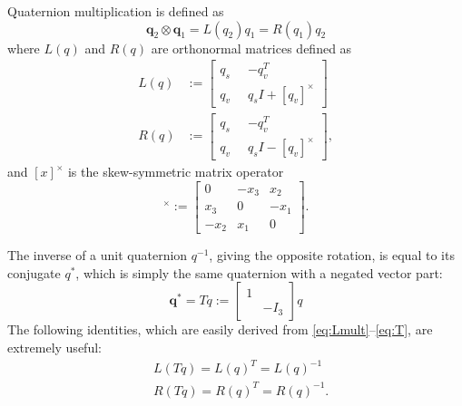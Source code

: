 \documentclass{svproc}
\newcommand{\skewmat}[1]{[#1]^\times}
\newcommand{\q}{\textbf{q}}
\begin{document}
        Quaternion multiplication is defined as
        \begin{equation} \label{eq:quat_mult}
            \q_2 \otimes \q_1 = L(q_2) q_1 = R(q_1) q_2
        \end{equation}
        where $L(q)$ and $R(q)$ are orthonormal matrices defined as
        \begin{align}
            L(q) &:= \begin{bmatrix} q_s \;\; & -q_v^T \\ q_v \;\; & q_s I + \skewmat{q_v} \end{bmatrix} 
            \label{eq:Lmult} \\
            R(q) &:=\begin{bmatrix} q_s \;\; & -q_v^T \\ q_v \;\; & q_s I - \skewmat{q_v} \end{bmatrix} \label{eq:Rmult},
        \end{align}
        and $\skewmat{x}$ is the skew-symmetric matrix operator
        \begin{equation}
            \skewmat{x} := \begin{bmatrix} 0 & -x_3 & x_2 \\ x_3 & 0 & -x_1\\ -x_2 & x_1 & 0 \end{bmatrix}.
        \end{equation}
        
        The inverse of a unit quaternion $q^{-1}$, giving the opposite rotation, is equal to its conjugate $q^*$, which is simply the same quaternion with a negated vector part:
        \begin{equation} \label{eq:T}
            \q^* = T q := \begin{bmatrix} 1 & \\ & -I_3 \end{bmatrix} q
        \end{equation}
        The following identities, which are easily derived from \eqref{eq:Lmult}--\eqref{eq:T}, are extremely useful:
        \begin{align}
            &L(Tq) = L(q)^T = L(q)^{-1} \\
            &R(Tq) = R(q)^T = R(q)^{-1} .
        \end{align}
        
\end{document}
